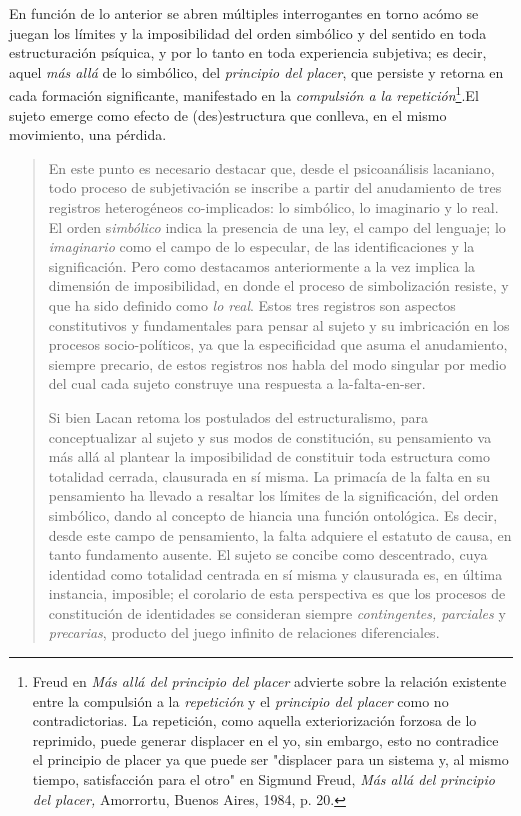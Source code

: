 En función de lo anterior se abren múltiples interrogantes en torno
acómo se juegan los límites y la imposibilidad del orden simbólico y del
sentido en toda estructuración psíquica, y por lo tanto en toda
experiencia subjetiva; es decir, aquel \emph{más allá} de lo simbólico,
del \emph{principio del placer}, que persiste y retorna en cada
formación significante, manifestado en la \emph{compulsión a la
repetición}\footnote{Freud en \emph{Más allá del principio del placer}
  advierte sobre la relación existente entre la compulsión a la
  \emph{repetición} y el \emph{principio del placer} como no
  contradictorias. La repetición, como aquella exteriorización forzosa
  de lo reprimido, puede generar displacer en el yo, sin embargo, esto
  no contradice el principio de placer ya que puede ser "displacer para
  un sistema y, al mismo tiempo, satisfacción para el otro" en Sigmund
  Freud, \emph{Más allá del principio del placer,} Amorrortu, Buenos
  Aires, 1984, p. 20.}.El sujeto emerge como efecto de (des)estructura
que conlleva, en el mismo movimiento, una pérdida.

\begin{quote}
En este punto es necesario destacar que, desde el psicoanálisis
lacaniano, todo proceso de subjetivación se inscribe a partir del
anudamiento de tres registros heterogéneos co-implicados: lo simbólico,
lo imaginario y lo real. El orden s\emph{imbólico} indica la presencia
de una ley, el campo del lenguaje; lo \emph{imaginario} como el campo de
lo especular, de las identificaciones y la significación. Pero como
destacamos anteriormente a la vez implica la dimensión de imposibilidad,
en donde el proceso de simbolización resiste, y que ha sido definido
como \emph{lo real}. Estos tres registros son aspectos constitutivos y
fundamentales para pensar al sujeto y su imbricación en los procesos
socio-políticos, ya que la especificidad que asuma el anudamiento,
siempre precario, de estos registros nos habla del modo singular por
medio del cual cada sujeto construye una respuesta a la-falta-en-ser.

Si bien Lacan retoma los postulados del estructuralismo, para
conceptualizar al sujeto y sus modos de constitución, su pensamiento va
más allá al plantear la imposibilidad de constituir toda estructura como
totalidad cerrada, clausurada en sí misma. La primacía de la falta en su
pensamiento ha llevado a resaltar los límites de la significación, del
orden simbólico, dando al concepto de hiancia una función ontológica. Es
decir, desde este campo de pensamiento, la falta adquiere el estatuto de
causa, en tanto fundamento ausente. El sujeto se concibe como
descentrado, cuya identidad como totalidad centrada en sí misma y
clausurada es, en última instancia, imposible; el corolario de esta
perspectiva es que los procesos de constitución de identidades se
consideran siempre \emph{contingentes, parciales} y \emph{precarias},
producto del juego infinito de relaciones diferenciales.
\end{quote}

